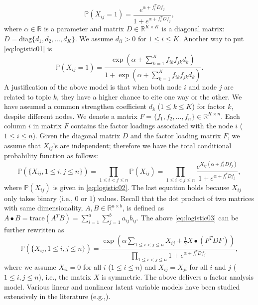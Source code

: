 \documentclass[AMS,STIX1COL]{WileyNJD-v2}
\begin{document}
\begin{equation}
\label{eq:logistic01}
\mathbb{P}(X_{ij}=1) = \frac{e^{\alpha + f_i^T D f_j }}{1 + e^{\alpha + f_i^T D f_j }},
\end{equation}
where $\alpha \in \mathbb{R}$ is a parameter and matrix $D \in \mathbb{R}^{K \times K}$ is a diagonal matrix: $D = \mbox{diag}\{d_{1},d_{2},\ldots,d_{K}\}$.
We assume $d_{ii} > 0$ for $1 \le i \le K$.
Another way to put \eqref{eq:logistic01} is
\begin{equation}
\label{eq:logistic02}
\mathbb{P}(X_{ij}=1) = \frac{\exp\left(\alpha + \sum_{k=1}^K f_{ik}f_{jk}d_{k} \right)}{1 + \exp\left(\alpha + \sum_{k=1}^K f_{ik}f_{jk}d_{k} \right)}.
\end{equation}
A justification of the above model is that when both node $i$ and node $j$ are related to topic $k$, they have a higher chance to cite one way or the other.
We have assumed a common strengthen coefficient $d_k$ ($1\le k \le K$) for factor $k$, despite different nodes.
We denote a matrix $F = \{f_1, f_2, \ldots, f_n\} \in \mathbb{R}^{K \times n}$.
Each column $i$ in matrix $F$ contains the factor loadings associated with the node $i$ ($1\le i \le n$).
Given the diagonal matrix $D$ and the factor loading matrix $F$, we assume that $X_{ij}$'s are independent; therefore we have the total conditional probability function as follows:
\begin{equation}
\label{eq:logistic03}
\mathbb{P}(\{X_{ij}, 1\le i,j \le n\})
= \prod_{1\le i<j \le n} \mathbb{P}(X_{ij})
= \prod_{1\le i<j \le n}  \frac{e^{X_{ij}(\alpha + f_i^T D f_j) }}{1 + e^{\alpha + f_i^T D f_j }},
\end{equation}
where $\mathbb{P}(X_{ij})$ is given in \eqref{eq:logistic02}.
The last equation holds because $X_{ij}$ only takes binary (i.e., $0$ or $1$) values.
Recall that the dot product of two matrices with same dimensionality, $A,B\in \mathbb{R}^{a \times b}$, is defined as $A\bullet B=\mbox{trace}(A^T B) = \sum_{i=1}^a\sum_{j=1}^b a_{ij}b_{ij}$.
The above \eqref{eq:logistic03} can be further rewritten as
\begin{equation}
\label{eq:logistic04}
\mathbb{P}(\{X_{ij}, 1\le i,j \le n\})
= \frac{\exp\left(\alpha \sum_{1\le i< j\le n}X_{ij} +\frac{1}{2} X \bullet (F^T D F)\right)}{\prod_{1\le i<j \le n}  1 + e^{\alpha + f_i^T D f_j }},
\end{equation}
where we assume $X_{ii}=0$ for all $i$ ($1\le i \le n$) and $X_{ij} = X_{ji}$ for all $i$ and $j$ ($1\le i,j \le n$), i.e., the matrix $X$ is symmetric.
The above delivers a factor analysis model.
Various linear and nonlinear latent variable models have been studied extensively in the literature (e.g.,\cite{joreskog1969general, mcdonald2014factor,lord2008statistical, rasch1980probabilistic, harman1960modern, joreskog1970general}).
\end{document}
